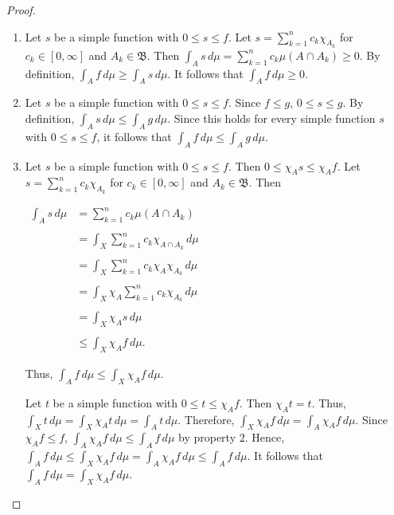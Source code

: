 \documentclass[12pt]{article}
\begin{document}
\begin{proof}

\begin{enumerate}
\item Let $s$ be a simple function with $0 \le s \le f$.  Let $\displaystyle s=\sum_{k=1}^n c_k \chi_{A_k}$ for $c_k \in [0,\infty]$ and $A_k \in \mathfrak{B}$.  Then $\displaystyle \int_A s \, d\mu =\sum_{k=1}^n c_k \mu(A \cap A_k) \ge 0$.  By definition, $\displaystyle \int_A f \, d\mu \ge \int_A s \, d\mu$.  It follows that $\displaystyle \int_A f \, d\mu \ge 0$.

\item Let $s$ be a simple function with $0 \le s \le f$.  Since $f \le g$, $0 \le s \le g$.  By definition, $\displaystyle \int_A s \, d\mu \le \int_A g \, d\mu$.  Since this holds for every simple function $s$ with $0 \le s \le f$, it follows that $\displaystyle \int_A f \, d\mu \le \int_A g \, d\mu$.

\item Let $s$ be a simple function with $0 \le s \le f$.  Then $0 \le \chi_As \le \chi_Af$.  Let $\displaystyle s=\sum_{k=1}^n c_k \chi_{A_k}$ for $c_k \in [0,\infty]$ and $A_k \in \mathfrak{B}$.  Then

\begin{center}
$\begin{array}{ll}
\displaystyle \int_A s \, d\mu & \displaystyle =\sum_{k=1}^n c_k \mu(A \cap A_k) \\
\\
& \displaystyle =\int_X \sum_{k=1}^n c_k \chi_{A \cap A_k} \, d\mu \\
\\
& \displaystyle =\int_X \sum_{k=1}^n c_k \chi_A \chi_{A_k} \, d\mu \\
\\
& \displaystyle =\int_X \chi_A\sum_{k=1}^n c_k \chi_{A_k} \, d\mu \\
\\
& \displaystyle =\int_X \chi_As \, d\mu \\
\\
& \displaystyle \le \int_X \chi_Af \, d\mu. \end{array}$
\end{center}

Thus, $\displaystyle \int_A f \, d\mu \le \int_X \chi_Af \, d\mu$.

Let $t$ be a simple function with $0 \le t \le \chi_Af$.  Then $\chi_At=t$.  Thus, $\displaystyle \int_X t \, d\mu =\int_X \chi_At \, d\mu=\int_A t \, d\mu$.  Therefore, $\displaystyle \int_X \chi_Af \, d\mu =\int_A \chi_Af \, d\mu$.  Since $\chi_Af \le f$, $\displaystyle \int_A \chi_Af \, d\mu \le \int_A f \, d\mu$ by property 2.  Hence, $\displaystyle \int_A f \, d\mu \le \int_X \chi_Af \, d\mu =\int_A \chi_Af \, d\mu \le \int_A f \, d\mu$.  It follows that $\displaystyle \int_A f \, d\mu =\int_X \chi_Af \, d\mu$.


\end{enumerate}
\end{proof}
\end{document}

